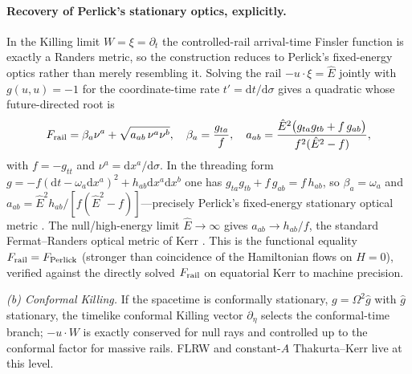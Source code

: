 \documentclass[12pt]{iopart}
\newcommand{\Ehat}{\hat E}
\newcommand{\dd}{\mathrm{d}}
\theoremstyle{plain}
\theoremstyle{definition}
\theoremstyle{plain}
\theoremstyle{remark}
\begin{document}
\paragraph{Recovery of Perlick's stationary optics, explicitly.} In the Killing limit
$W=\xi=\partial_t$ the controlled-rail arrival-time Finsler function is exactly a
Randers metric, so the construction reduces to Perlick's fixed-energy optics rather
than merely resembling it. Solving the rail $-u\cdot\xi=\Ehat$ jointly with
$g(u,u)=-1$ for the coordinate-time rate $t'=\dd t/\dd\sigma$ gives a quadratic whose
future-directed root is
\begin{equation}
F_{\rm rail}=\beta_a \nu^a+\sqrt{a_{ab}\,\nu^a \nu^b},\quad
\beta_a=\frac{g_{ta}}{f},\quad
a_{ab}=\frac{\Ehat^2\bigl(g_{ta}g_{tb}+f\,g_{ab}\bigr)}{f^2(\Ehat^2-f)},
\label{eq:perlick-randers}
\end{equation}
with $f=-g_{tt}$ and $\nu^a=\dd x^a/\dd\sigma$. In the threading form
$g=-f(\dd t-\omega_a\dd x^a)^2+h_{ab}\dd x^a\dd x^b$ one has
$g_{ta}g_{tb}+f\,g_{ab}=f\,h_{ab}$, so $\beta_a=\omega_a$ and
$a_{ab}=\Ehat^2 h_{ab}/[f(\Ehat^2-f)]$---precisely Perlick's fixed-energy stationary
optical metric \cite{Perlick1991}. The null/high-energy limit $\Ehat\to\infty$ gives
$a_{ab}\to h_{ab}/f$, the standard Fermat--Randers optical metric of Kerr
\cite{GibbonsWerner2008}. This is the functional equality $F_{\rm rail}=F_{\rm Perlick}$
(stronger than coincidence of the Hamiltonian flows on $H=0$), verified against the
directly solved $F_{\rm rail}$ on equatorial Kerr to machine precision.

\emph{(b) Conformal Killing.} If the spacetime is conformally stationary,
$g=\Omega^2\hat g$ with $\hat g$ stationary, the timelike conformal Killing
vector $\partial_\eta$ selects the conformal-time branch; $-u\cdot W$ is exactly
conserved for null rays and controlled up to the conformal factor for massive
rails. FLRW and constant-$A$ Thakurta--Kerr live at this level.
\end{document}
